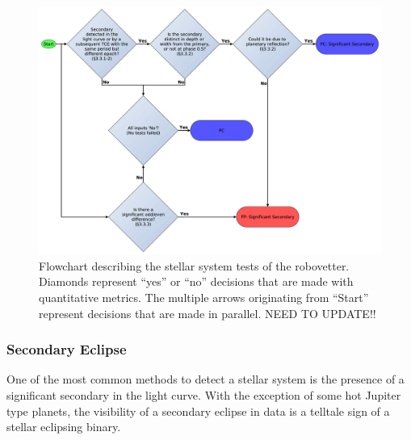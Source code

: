 



\begin{figure}[ht]
\centering
\includegraphics[width=\linewidth]{RoboVetter-Diagram-V3-SigSec.pdf}
\caption{Flowchart describing the stellar system tests of the robovetter. Diamonds represent ``yes'' or ``no'' decisions that are made with quantitative metrics. The multiple arrows originating from ``Start'' represent decisions that are made in parallel. NEED TO UPDATE!!}
\label{robovetter-sigsec-fig}
\end{figure}


\subsubsection{Secondary Eclipse}

One of the most common methods to detect a stellar system is the presence of a significant secondary in the light curve. With the exception of some hot Jupiter type planets, the visibility of a secondary eclipse in \kepler{} data is a telltale sign of a stellar eclipsing binary.



